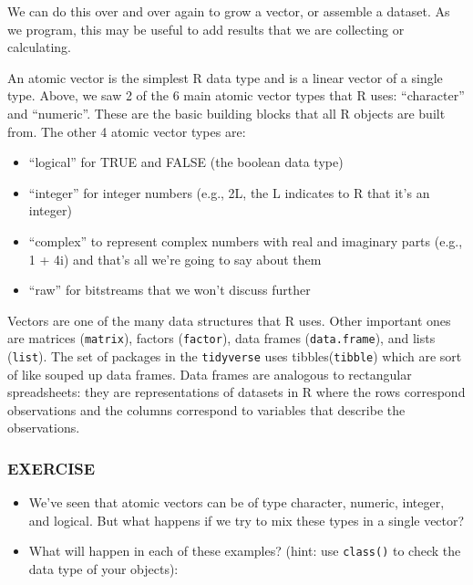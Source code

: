 \documentclass[]{book}
\providecommand{\tightlist}{%
  \setlength{\itemsep}{0pt}\setlength{\parskip}{0pt}}
\begin{document}
We can do this over and over again to grow a vector, or assemble a dataset. As we program, this may be useful to add results that we are collecting or calculating.

An atomic vector is the simplest R data type and is a linear vector of a single type. Above, we saw 2 of the 6 main atomic vector types that R uses: ``character'' and ``numeric''. These are the basic building blocks that all R objects are built from. The other 4 atomic vector types are:

\begin{itemize}
\tightlist
\item
  ``logical'' for TRUE and FALSE (the boolean data type)
\item
  ``integer'' for integer numbers (e.g., 2L, the L indicates to R that it's an integer)
\item
  ``complex'' to represent complex numbers with real and imaginary parts (e.g., 1 + 4i) and that's all we're going to say about them
\item
  ``raw'' for bitstreams that we won't discuss further
\end{itemize}

Vectors are one of the many data structures that R uses. Other important ones are matrices (\texttt{matrix}), factors (\texttt{factor}), data frames (\texttt{data.frame}), and lists (\texttt{list}). The set of packages in the \texttt{tidyverse} uses tibbles(\texttt{tibble}) which are sort of like souped up data frames. Data frames are analogous to rectangular spreadsheets: they are representations of datasets in R where the rows correspond observations and the columns correspond to variables that describe the observations.

\hypertarget{exercise-6}{%
\subsubsection*{EXERCISE}\label{exercise-6}}

\begin{itemize}
\item
  We've seen that atomic vectors can be of type character, numeric, integer, and logical. But what happens if we try to mix these types in a single vector?
\item
  What will happen in each of these examples? (hint: use \texttt{class()} to check the data type of your objects):
\end{itemize}
\end{document}
